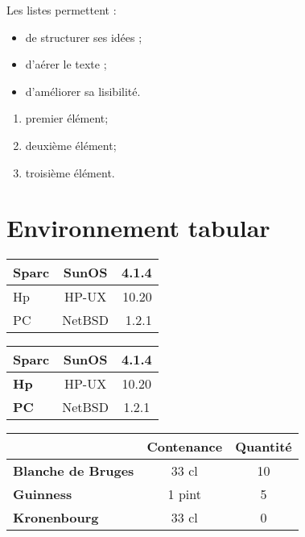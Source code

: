 \documentclass[a4paper,11pt]{article}
\begin{document}
Les listes permettent :
\begin{itemize}

\item de structurer ses idées ;

\item d'aérer le texte ;

\item d'améliorer sa lisibilité.

\end{itemize}

\begin{enumerate}

\item premier élément;

\item deuxième élément;

\item troisième élément.

\end{enumerate}

\section{Environnement tabular}

\begin{tabular}{|l|c|r|}
\hline
Sparc & SunOS  & 4.1.4 \\
\hline
Hp     & HP-UX  & 10.20 \\
\hline
PC     & NetBSD & 1.2.1  \\
\hline 
\end{tabular}

\bigskip

\begin{tabular}{|p{5cm}|*{2}{c|}}
\hline
\bfseries Sparc & SunOS  & 4.1.4 \\
\hline
\bfseries Hp     & HP-UX  & 10.20 \\
\hline
\bfseries PC     & NetBSD & 1.2.1  \\
\hline 
\end{tabular}

\bigskip


\begin{tabular}{|p{5cm}|*{2}{c|}}
\hline
					                & Contenance & Quantité \\
\hline
\bfseries Blanche de Bruges & 33 cl            & 10          \\
\hline
\bfseries Guinness               & 1 pint           & 5            \\
\hline
\bfseries Kronenbourg         & 33 cl             & 0            \\
\hline
\end{tabular}
\end{document}
